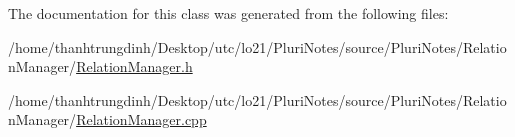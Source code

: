 The documentation for this class was generated from the following files\+:\begin{DoxyCompactItemize}
\item 
/home/thanhtrungdinh/\+Desktop/utc/lo21/\+Pluri\+Notes/source/\+Pluri\+Notes/\+Relation\+Manager/\hyperlink{RelationManager_8h}{Relation\+Manager.\+h}\item 
/home/thanhtrungdinh/\+Desktop/utc/lo21/\+Pluri\+Notes/source/\+Pluri\+Notes/\+Relation\+Manager/\hyperlink{RelationManager_8cpp}{Relation\+Manager.\+cpp}\end{DoxyCompactItemize}
